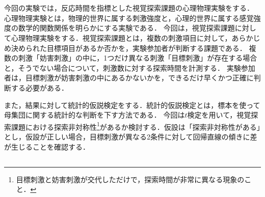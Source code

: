 \chapter{\kadaib}
\section{\purpose}
今回の実験では，反応時間を指標とした視覚探索課題の心理物理実験をする．
心理物理実験とは，物理的世界に属する刺激強度と，心理的世界に属する感覚強度の数学的関数関係を明らかにする実験である\cite{心理物理測定法}．
今回は，視覚探索課題に対して心理物理実験をする．視覚探索課題とは，複数の刺激項目に対して，あらかじめ決められた目標項目があるか否かを，実験参加者が判断する課題である\cite{視覚探索}．
複数の刺激「妨害刺激」の中に，1つだけ異なる刺激「目標刺激」が存在する場合と，そうでない場合について，刺激数に対する探索時間を計測する．
実験参加者は，目標刺激が妨害刺激の中にあるかないかを，できるだけ早くかつ正確に判断する必要がある．\par
また，結果に対して統計的仮説検定をする．統計的仮説検定とは，標本を使って母集団に関する統計的な判断を下す方法である\cite[p.200]{Pythonで学ぶあたらしい統計学の教科書}．
今回は\(t\)検定を用いて，視覚探索課題における探索非対称性\footnote{目標刺激と妨害刺激が交代しただけで，探索時間が非常に異なる現象のこと\cite{4視覚探索}．}があるか検討する．仮設は「探索非対称性がある」とし，仮設が正しい場合，目標刺激が異なる2条件に対して回帰直線の傾きに差が生じることを確認する．
\section{\method}
